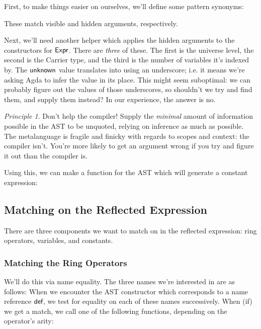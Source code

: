 \documentclass[draft, twocolumn]{article}
\theoremstyle{definition}
\theoremstyle{remark}
\newtheorem{principle}{Principle}[section]
\begin{document}
First, to make things easier on ourselves, we'll define some pattern synonyms:

These match visible and hidden arguments, respectively.

Next, we'll need another helper which applies the hidden arguments to the
constructors for \(\AgdaDatatype{Expr}\). There are \emph{three} of these. The
first is the universe level, the second is the Carrier type, and the third is
the number of variables it's indexed by.
The \(\AgdaInductiveConstructor{unknown}\) value translates into using an
underscore; i.e. it means we're asking Agda to infer the value in its place.
This might seem suboptimal: we can probably figure out the values of those
underscores, so shouldn't we try and find them, and supply them instead? In our
experience, the answer is no.

\begin{principle}{Don't help the compiler!}
  Supply the \emph{minimal} amount of information possible in the AST to be
  unquoted, relying on inference as much as possible. The metalanguage is
  fragile and finicky with regards to scopes and context: the compiler isn't.
  You're more likely to get an argument wrong if you try and figure it out than
  the compiler is.
\end{principle}

Using this, we can make a function for the AST which will generate a constant
expression:
\subsection{Matching on the Reflected Expression}
There are three components we want to match on in the reflected expression: ring
operators, variables, and constants.
\subsubsection{Matching the Ring Operators}
We'll do this via name equality. The three names we're interested in are as
follows:
When we encounter the AST constructor which corresponds to a name reference
\(\AgdaInductiveConstructor{def}\), we test for equality on each of these names
successively. When (if) we get a match, we call one of the following functions,
depending on the operator's arity:
\end{document}

